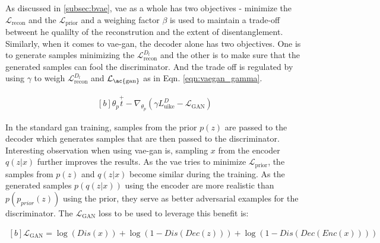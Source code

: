 As discussed in \ref{subsec:bvae}, \ac{vae} as a whole has two objectives - minimize the $\mathcal{L}_{\text {recon}}$ and the $\mathcal{L}_{\text {prior}}$ and a weighing factor $\beta$ is used to maintain a trade-off betweent he qualilty of the reconstrution and the extent of disentanglement. Similarly, when it comes to \ac{vae}-\ac{gan}, the decoder alone has two objectives. One is to generate samples minimizing the $\mathcal{L}_{\text {recon}}^{D_{l}}$ and the other is to make sure that the generated samples can fool the discriminator. And the trade off is regulated by using $\gamma$ to weigh $\mathcal{L}_{\text {recon}}^{D_{l}}$ and $\mathcal{L}_{\text {\ac{gan}}}$ as in Eqn. \ref{eqn:vaegan_gamma}.
 
\begin{equation} \label{eqn:vaegan_gamma}
    \begin{gathered}[b]
        \theta_{p} \stackrel{+}{t}-\nabla_{\theta_{p}}\left(\gamma L_{\mathrm{uike}}^{D}-\mathcal{L}_{\mathrm{GAN}}\right)
    \end{gathered}
\end{equation}

In the standard \ac{gan} training, samples from the prior $p(z)$ are passed to the decoder which generates samples that are then passed to the discriminator. Interesting observation when using \ac{vae}-\ac{gan} is, sampling $x$ from the encoder $q(z|x)$ further improves the results. As the \ac{vae} tries to minimize $\mathcal{L}_{\text{prior}}$, the samples from $p(z)$ and $q(z|x)$ become similar during the training. As the generated samples $p(q(z|x))$ using the encoder are more realistic than $p(p_{prior}(z))$ using the prior, they serve as better adversarial examples for the discriminator. The $\mathcal{L}_{\mathrm{GAN}}$ loss to be used to leverage this benefit is: 


\begin{equation} \label{eqn:vaegan_ganloss}
    \begin{gathered}[b]
        \mathcal{L}_{\mathrm{GAN}}=\log (Dis(x))+\log (1-Dis(Dec(z)))+\log (1-Dis(Dec(Enc(x))))
    \end{gathered}
\end{equation}

